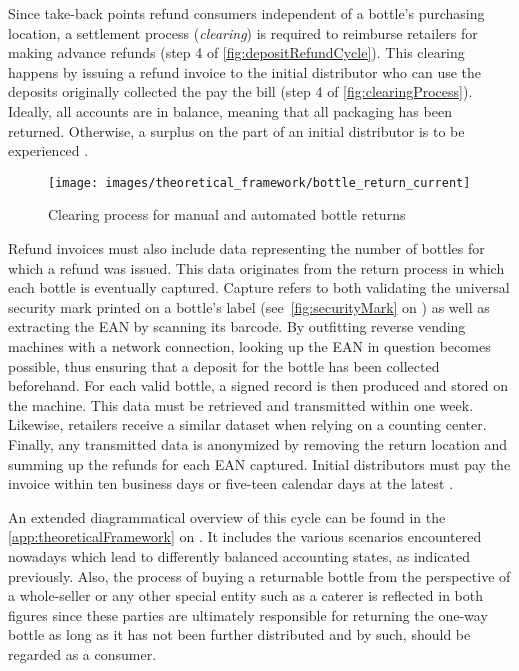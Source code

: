 Since take-back points refund consumers independent of a bottle’s purchasing location, a settlement process (\textit{clearing}) is required to reimburse retailers for making advance refunds (step 4 of \autoref{fig:depositRefundCycle}). This clearing happens by issuing a refund invoice to the initial distributor who can use the deposits originally collected the pay the bill (step 4 of \autoref{fig:clearingProcess}). Ideally, all accounts are in balance, meaning that all packaging has been returned. Otherwise, a surplus on the part of an initial distributor is to be experienced \cite[p.~17]{Hartlep2011Recycling}.

\begin{figure}[hbt]
	\centering
  	\texttt{[image: images/theoretical\_framework/bottle\_return\_current]}
  	\caption[Clearing process for manual and automated bottle returns]{Clearing process for manual and automated bottle returns \cite[p.~18]{Hartlep2011Recycling}}
  	\label{fig:clearingProcess}
\end{figure}

Refund invoices must also include data representing the number of bottles for which a refund was issued. This data originates from the return process in which each bottle is eventually captured. Capture refers to both validating the universal security mark printed on a bottle’s label (see~\autoref{fig:securityMark} on ) as well as extracting the \ac{EAN} by scanning its barcode. By outfitting reverse vending machines with a network connection, looking up the \ac{EAN} in question becomes possible, thus ensuring that a deposit for the bottle has been collected beforehand. For each valid bottle, a signed record is then produced and stored on the machine. This data must be retrieved and transmitted within one week. Likewise, retailers receive a similar dataset when relying on a counting center. Finally, any transmitted data is anonymized by removing the return location and summing up the refunds for each \ac{EAN} captured. Initial distributors must pay the invoice within ten business days or five-teen calendar days at the latest  \cite[p.~18-19]{Hartlep2011Recycling}.

An extended diagrammatical overview of this cycle can be found in the \autoref{app:theoreticalFramework} on . It includes the various scenarios encountered nowadays which lead to differently balanced accounting states, as indicated previously. Also, the process of buying a returnable bottle from the perspective of a whole-seller or any other special entity such as a caterer is reflected in both figures since these parties are ultimately responsible for returning the one-way bottle as long as it has not been further distributed and by such, should be regarded as a consumer.


